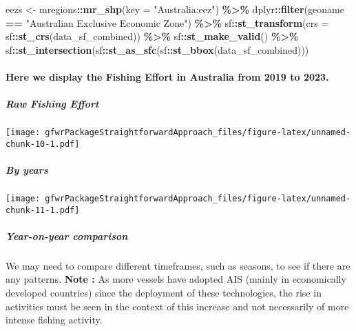 \documentclass[
]{article}
\newenvironment{Shaded}{\begin{snugshade}}{\end{snugshade}}
\newcommand{\AttributeTok}[1]{\textcolor[rgb]{0.13,0.29,0.53}{#1}}
\newcommand{\FunctionTok}[1]{\textcolor[rgb]{0.13,0.29,0.53}{\textbf{#1}}}
\newcommand{\NormalTok}[1]{#1}
\newcommand{\OtherTok}[1]{\textcolor[rgb]{0.56,0.35,0.01}{#1}}
\newcommand{\SpecialCharTok}[1]{\textcolor[rgb]{0.81,0.36,0.00}{\textbf{#1}}}
\newcommand{\StringTok}[1]{\textcolor[rgb]{0.31,0.60,0.02}{#1}}
\begin{document}
\begin{Shaded}
\begin{Highlighting}[]
\NormalTok{eezs }\OtherTok{\textless{}{-}}\NormalTok{ mregions}\SpecialCharTok{::}\FunctionTok{mr\_shp}\NormalTok{(}\AttributeTok{key =} \StringTok{"Australia:eez"}\NormalTok{) }\SpecialCharTok{\%\textgreater{}\%}
\NormalTok{  dplyr}\SpecialCharTok{::}\FunctionTok{filter}\NormalTok{(geoname }\SpecialCharTok{==} \StringTok{"Australian Exclusive Economic Zone"}\NormalTok{) }\SpecialCharTok{\%\textgreater{}\%}
\NormalTok{  sf}\SpecialCharTok{::}\FunctionTok{st\_transform}\NormalTok{(}\AttributeTok{crs =}\NormalTok{ sf}\SpecialCharTok{::}\FunctionTok{st\_crs}\NormalTok{(data\_sf\_combined)) }\SpecialCharTok{\%\textgreater{}\%}
\NormalTok{  sf}\SpecialCharTok{::}\FunctionTok{st\_make\_valid}\NormalTok{() }\SpecialCharTok{\%\textgreater{}\%}
\NormalTok{  sf}\SpecialCharTok{::}\FunctionTok{st\_intersection}\NormalTok{(sf}\SpecialCharTok{::}\FunctionTok{st\_as\_sfc}\NormalTok{(sf}\SpecialCharTok{::}\FunctionTok{st\_bbox}\NormalTok{(data\_sf\_combined)))}
\end{Highlighting}
\end{Shaded}

\hypertarget{here-we-display-the-fishing-effort-in-australia-from-2019-to-2023.}{%
\paragraph{Here we display the Fishing Effort in Australia from 2019 to
2023.}\label{here-we-display-the-fishing-effort-in-australia-from-2019-to-2023.}}

\hypertarget{raw-fishing-effort}{%
\subparagraph{Raw Fishing Effort}\label{raw-fishing-effort}}

\texttt{[image: gfwrPackageStraightforwardApproach\_files/figure-latex/unnamed-chunk-10-1.pdf]}

\hypertarget{by-years}{%
\subparagraph{By years}\label{by-years}}

\texttt{[image: gfwrPackageStraightforwardApproach\_files/figure-latex/unnamed-chunk-11-1.pdf]}

\hypertarget{year-on-year-comparison}{%
\subparagraph{Year-on-year comparison}\label{year-on-year-comparison}}

We may need to compare different timeframes, such as seasons, to see if
there are any patterns. \textbf{Note :} As more vessels have adopted AIS
(mainly in economically developed countries) since the deployment of
these technologies, the rise in activities must be seen in the context
of this increase and not necessarily of more intense fishing activity.
\end{document}
